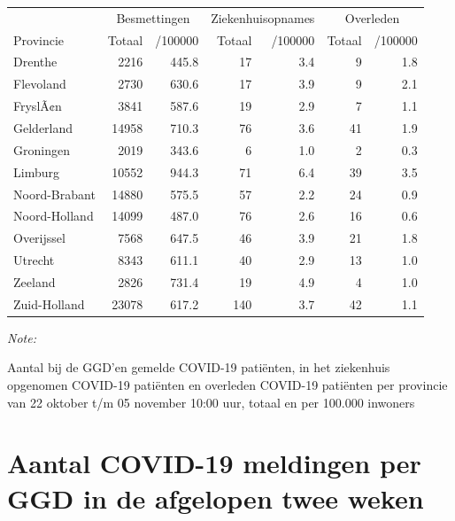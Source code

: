 \documentclass[
  english,
  man,floatsintext]{apa6}
\begin{document}
\begin{table}
\centering
\begin{threeparttable}
\begin{tabular}{lrrrrrr}
\toprule
\multicolumn{1}{c}{ } & \multicolumn{2}{c}{Besmettingen} & \multicolumn{2}{c}{Ziekenhuisopnames} & \multicolumn{2}{c}{Overleden} \\
\cmidrule(l{3pt}r{3pt}){2-3} \cmidrule(l{3pt}r{3pt}){4-5} \cmidrule(l{3pt}r{3pt}){6-7}
Provincie & Totaal & /100000 & Totaal & /100000 & Totaal & /100000\\
\midrule
Drenthe & 2216 & 445.8 & 17 & 3.4 & 9 & 1.8\\
Flevoland & 2730 & 630.6 & 17 & 3.9 & 9 & 2.1\\
FryslÃ¢n & 3841 & 587.6 & 19 & 2.9 & 7 & 1.1\\
Gelderland & 14958 & 710.3 & 76 & 3.6 & 41 & 1.9\\
Groningen & 2019 & 343.6 & 6 & 1.0 & 2 & 0.3\\
Limburg & 10552 & 944.3 & 71 & 6.4 & 39 & 3.5\\
Noord-Brabant & 14880 & 575.5 & 57 & 2.2 & 24 & 0.9\\
Noord-Holland & 14099 & 487.0 & 76 & 2.6 & 16 & 0.6\\
Overijssel & 7568 & 647.5 & 46 & 3.9 & 21 & 1.8\\
Utrecht & 8343 & 611.1 & 40 & 2.9 & 13 & 1.0\\
Zeeland & 2826 & 731.4 & 19 & 4.9 & 4 & 1.0\\
Zuid-Holland & 23078 & 617.2 & 140 & 3.7 & 42 & 1.1\\
\bottomrule
\end{tabular}
\begin{tablenotes}
\item \textit{Note: } 
\item Aantal bij de GGD’en gemelde COVID-19 patiënten, in het ziekenhuis opgenomen COVID-19 patiënten en overleden COVID-19 patiënten per provincie van 22 oktober t/m 05 november 10:00 uur, totaal en per 100.000 inwoners
\end{tablenotes}
\end{threeparttable}
\end{table}

\newpage

\hypertarget{aantal-covid-19-meldingen-per-ggd-in-de-afgelopen-twee-weken}{%
\section{Aantal COVID-19 meldingen per GGD in de afgelopen twee weken}\label{aantal-covid-19-meldingen-per-ggd-in-de-afgelopen-twee-weken}}
\end{document}
